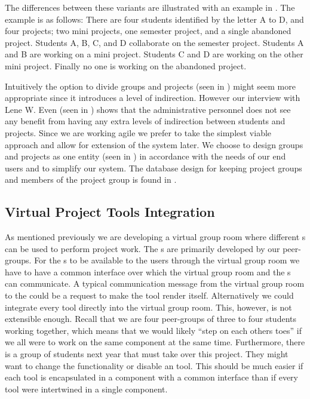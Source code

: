 The differences between these variants are illustrated with an example in .
The example is as follows:
There are four students identified by the letter A to D, and four projects; two mini projects, one semester project, and a single abandoned project.
Students A, B, C, and D collaborate on the semester project.
Students A and B are working on a mini project.
Students C and D are working on the other mini project.
Finally no one is working on the abandoned project.

Intuitively the option to divide groups and projects (seen in ) might seem more appropriate since it introduces a level of indirection.
However our interview with Lene W. Even (seen in ) shows that the administrative personnel does not see any benefit from having any extra levels of indirection between students and projects.
Since we are working agile we prefer to take the simplest viable approach and allow for extension of the system later.
We choose to design groups and projects as one entity (seen in ) in accordance with the needs of our end users and to simplify our system.
The database design for keeping project groups and members of the project group is found in .

\subsection{Virtual Project Tools Integration}
\label{sub:interActivities}
As mentioned previously we are developing a virtual group room where different \detdeandrelaver[]s can be used to perform project work.
The \detdeandrelaver[]s are primarily developed by our peer-groups.
For the \detdeandrelaver[]s to be available to the users through the virtual group room we have to have a common interface over which the virtual group room and the \detdeandrelaver[]s can communicate.
A typical communication message from the virtual group room to the \detdeandrelaver{} could be a request to make the tool render itself.
Alternatively we could integrate every tool directly into the virtual group room.
This, however, is not extensible enough.
Recall that we are four peer-groups of three to four students working together, which means that we would likely ``step on each others toes'' if we all were to work on the same component at the same time.
Furthermore, there is a group of students next year that must take over this project.
They might want to change the functionality or disable an tool.
This should be much easier if each tool is encapsulated in a component with a common interface than if every tool were intertwined in a single component.

